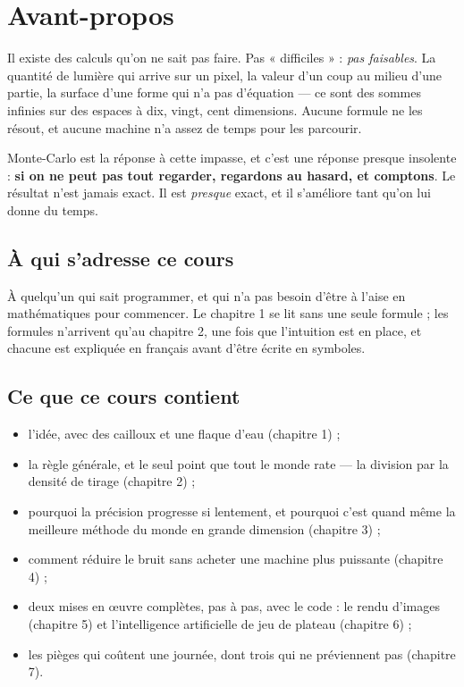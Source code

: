 \chapter{Avant-propos}

Il existe des calculs qu'on ne sait pas faire. Pas « difficiles » : \emph{pas
faisables}. La quantité de lumière qui arrive sur un pixel, la valeur d'un coup
au milieu d'une partie, la surface d'une forme qui n'a pas d'équation — ce sont
des sommes infinies sur des espaces à dix, vingt, cent dimensions. Aucune
formule ne les résout, et aucune machine n'a assez de temps pour les parcourir.

Monte-Carlo est la réponse à cette impasse, et c'est une réponse presque
insolente : \textbf{si on ne peut pas tout regarder, regardons au hasard, et
comptons}. Le résultat n'est jamais exact. Il est \emph{presque} exact, et il
s'améliore tant qu'on lui donne du temps.

\section{À qui s'adresse ce cours}

À quelqu'un qui sait programmer, et qui n'a pas besoin d'être à l'aise en
mathématiques pour commencer. Le chapitre 1 se lit sans une seule formule ; les
formules n'arrivent qu'au chapitre 2, une fois que l'intuition est en place, et
chacune est expliquée en français avant d'être écrite en symboles.

\section{Ce que ce cours contient}

\begin{itemize}
  \item l'idée, avec des cailloux et une flaque d'eau (chapitre 1) ;
  \item la règle générale, et le seul point que tout le monde rate — la
        division par la densité de tirage (chapitre 2) ;
  \item pourquoi la précision progresse si lentement, et pourquoi c'est quand
        même la meilleure méthode du monde en grande dimension (chapitre 3) ;
  \item comment réduire le bruit sans acheter une machine plus puissante
        (chapitre 4) ;
  \item deux mises en œuvre complètes, pas à pas, avec le code : le rendu
        d'images (chapitre 5) et l'intelligence artificielle de jeu de plateau
        (chapitre 6) ;
  \item les pièges qui coûtent une journée, dont trois qui ne préviennent pas
        (chapitre 7).
\end{itemize}

